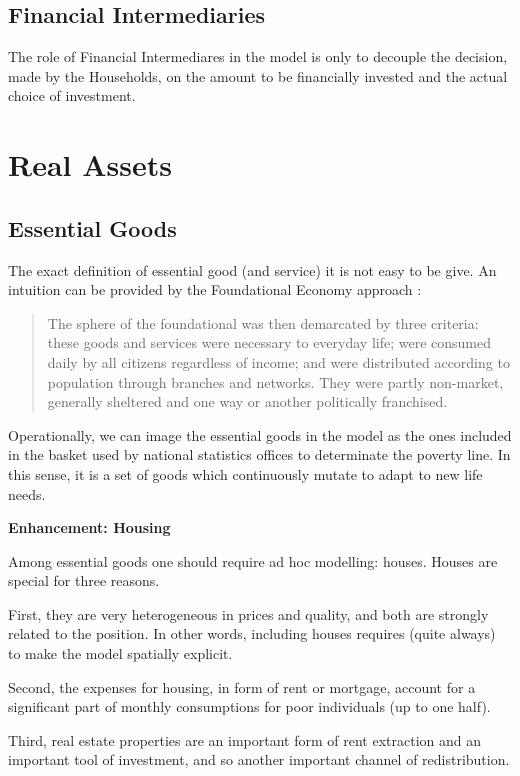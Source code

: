 \documentclass[a4paper, headings=standardclasses]{scrartcl}
\newenvironment{enh}[1][]{\begin{framed}\noindent\textbf{Enhancement: #1}\par}{\end{framed}}
\begin{document}
\subsection{Financial Intermediaries}
The role of Financial Intermediares in the model is only to decouple the decision, made by the Households, on the amount to be financially invested and the actual choice of investment.

\section{Real Assets}
\subsection{Essential Goods}
The exact definition of essential good (and service) it is not easy to be give. An intuition can be provided by the Foundational Economy approach \parencite{arcidiacono2018a}: \begin{quote}
	The sphere of the foundational was then demarcated by three criteria: these goods and services were necessary to everyday life; were consumed daily by all citizens regardless of income; and were distributed according to population through branches and networks. They were partly non-market, generally sheltered and one way or another politically franchised.
\end{quote}

Operationally, we can image the essential goods in the model as the ones included in the basket used by national statistics offices to determinate the poverty line. In this sense, it is a set of goods which continuously mutate to adapt to new life needs.

\begin{enh}[Housing]
	Among essential goods one should require ad hoc modelling: houses. Houses are special for three reasons.
	
	First, they are very heterogeneous in prices and quality, and both are strongly related to the position. In other words, including houses requires (quite always) to make the model spatially explicit.
	
	Second, the expenses for housing, in form of rent or mortgage, account for a significant part of monthly consumptions for poor individuals (up to one half).
	
	Third, real estate properties are an important form of rent extraction and an important tool of investment, and so another important channel of redistribution.
\end{enh}
\end{document}
